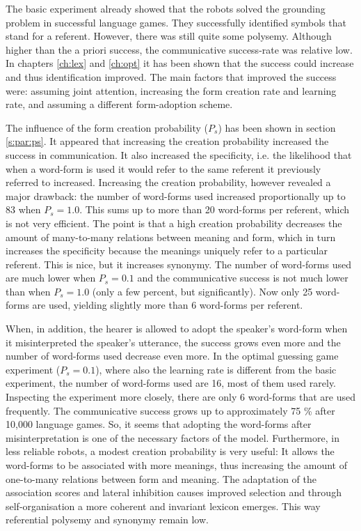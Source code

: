 The basic experiment already showed that the robots solved the grounding problem in successful language games. They successfully identified symbols that stand for a referent. However, there was still quite some polysemy. Although higher than the a priori success, the communicative success-rate was relative low. In chapters \ref{ch:lex} and \ref{ch:opt} it has been shown that the success could increase and thus identification improved. The main factors that improved the success were: assuming joint attention, increasing the form creation rate and learning rate, and assuming a different form-adoption scheme.

The influence of the form creation probability ($P_s$) has been shown in section \ref{s:par:ps}. It appeared that increasing the creation probability increased the success in communication. It also increased the specificity, i.e. the likelihood that when a word-form is used it would refer to the same referent it previously referred to increased. Increasing the creation probability, however revealed a major drawback: the number of word-forms used increased proportionally up to 83 when $P_s=1.0$. This sums up to more than 20 word-forms per referent, which is not very efficient. The point is that a high creation probability decreases the amount of many-to-many relations between meaning and form, which in turn increases the specificity because the meanings uniquely refer to a particular referent. This is nice, but it increases synonymy. The number of word-forms used are much lower when $P_s=0.1$ and the communicative success is not much lower than when $P_s=1.0$ (only a few percent, but significantly). Now only 25 word-forms are used, yielding slightly more than 6 word-forms per referent. 

When, in addition, the hearer is allowed to adopt the speaker's word-form when it misinterpreted the speaker's utterance, the success grows even more and the number of word-forms used decrease even more. In the optimal guessing game experiment ($P_s=0.1$), where also the learning rate is different from the basic experiment, the number of word-forms used are 16, most of them used rarely. Inspecting the experiment more closely, there are only 6 word-forms that are used frequently. The communicative success grows up to approximately 75 \% after 10,000 language games. So, it seems that adopting the word-forms after misinterpretation is one of the necessary factors of the model. Furthermore, in less reliable robots, a modest creation probability is very useful: It allows the word-forms to be associated with more meanings, thus increasing the amount of one-to-many relations between form and meaning. The adaptation of the association scores and lateral inhibition causes improved selection and through self-organisation a more coherent and invariant lexicon emerges. This way referential polysemy and synonymy remain low.

